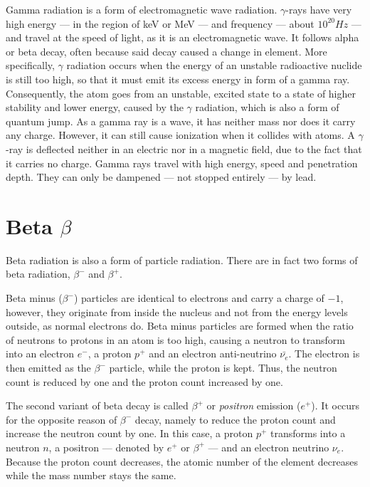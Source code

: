 Gamma radiation is a form of electromagnetic wave radiation. $\gamma$-rays have very high energy --- in the region of keV or MeV --- and frequency --- about $10^{20} Hz$ --- and travel at the speed of light, as it is an electromagnetic wave. It follows alpha or beta decay, often because said decay caused a change in element. More specifically, $\gamma$ radiation occurs when the energy of an unstable radioactive nuclide is still too high, so that it must emit its excess energy in form of a gamma ray. Consequently, the atom goes from an unstable, excited state to a state of higher stability and lower energy, caused by the $\gamma$ radiation, which is also a form of quantum jump. As a gamma ray is a wave, it has neither mass nor does it carry any charge. However, it can still cause ionization when it collides with atoms. A $\gamma$-ray is deflected neither in an electric nor in a magnetic field, due to the fact that it carries no charge. Gamma rays travel with high energy, speed and penetration depth. They can only be dampened --- not stopped entirely --- by lead.

\pagebreak

\section*{Beta $\beta$}

Beta radiation is also a form of particle radiation. There are in fact two forms of beta radiation, $\beta^-$ and $\beta^+$.

 Beta minus ($\beta^-$) particles are identical to electrons and carry a charge of $-1$, however, they originate from inside the nucleus and not from the energy levels outside, as normal electrons do. Beta minus particles are formed when the ratio of neutrons to protons in an atom is too high, causing a neutron to transform into an electron $e^-$, a proton $p^+$ and an electron anti-neutrino $\bar{\nu_{e}}$. The electron is then emitted as the $\beta^-$ particle, while the proton is kept. Thus, the neutron count is reduced by one and the proton count increased by one.

The second variant of beta decay is called $\beta^+$ or \emph{positron} emission ($e^+$). It occurs for the opposite reason of $\beta^-$ decay, namely to reduce the proton count and increase the neutron count by one. In this case, a proton $p^+$ transforms into a neutron $n$, a positron --- denoted by $e^+$ or $\beta^+$ --- and an electron neutrino $\nu_{e}$. Because the proton count decreases, the atomic number of the element decreases while the mass number stays the same.

